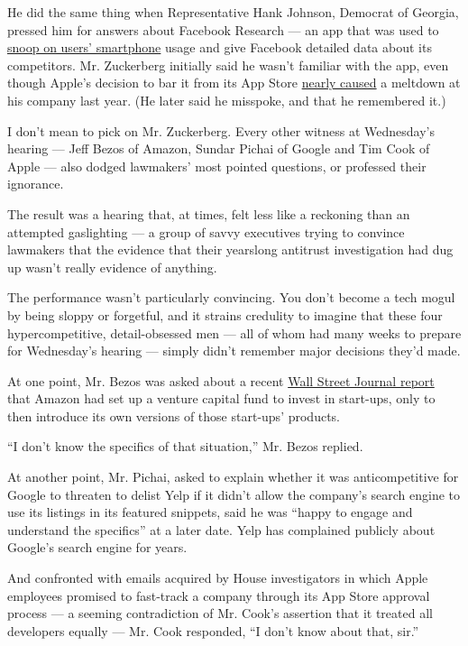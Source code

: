 He did the same thing when Representative Hank Johnson, Democrat of
Georgia, pressed him for answers about Facebook Research --- an app that
was used to
\href{https://www.wired.com/story/facebook-research-app-root-certificate/}{snoop
on users' smartphone} usage and give Facebook detailed data about its
competitors. Mr. Zuckerberg initially said he wasn't familiar with the
app, even though Apple's decision to bar it from its App Store
\href{https://www.nytimes3xbfgragh.onion/2019/01/31/technology/apple-blocks-facebook.html}{nearly
caused} a meltdown at his company last year. (He later said he misspoke,
and that he remembered it.)

I don't mean to pick on Mr. Zuckerberg. Every other witness at
Wednesday's hearing --- Jeff Bezos of Amazon, Sundar Pichai of Google
and Tim Cook of Apple --- also dodged lawmakers' most pointed questions,
or professed their ignorance.

The result was a hearing that, at times, felt less like a reckoning than
an attempted gaslighting --- a group of savvy executives trying to
convince lawmakers that the evidence that their yearslong antitrust
investigation had dug up wasn't really evidence of anything.

The performance wasn't particularly convincing. You don't become a tech
mogul by being sloppy or forgetful, and it strains credulity to imagine
that these four hypercompetitive, detail-obsessed men --- all of whom
had many weeks to prepare for Wednesday's hearing --- simply didn't
remember major decisions they'd made.

At one point, Mr. Bezos was asked about a recent
\href{https://www.wsj.com/articles/amazon-tech-startup-echo-bezos-alexa-investment-fund-11595520249}{Wall
Street Journal report} that Amazon had set up a venture capital fund to
invest in start-ups, only to then introduce its own versions of those
start-ups' products.

``I don't know the specifics of that situation,'' Mr. Bezos replied.

At another point, Mr. Pichai, asked to explain whether it was
anticompetitive for Google to threaten to delist Yelp if it didn't allow
the company's search engine to use its listings in its featured
snippets, said he was ``happy to engage and understand the specifics''
at a later date. Yelp has complained publicly about Google's search
engine for years.

And confronted with emails acquired by House investigators in which
Apple employees promised to fast-track a company through its App Store
approval process --- a seeming contradiction of Mr. Cook's assertion
that it treated all developers equally --- Mr. Cook responded, ``I don't
know about that, sir.''

